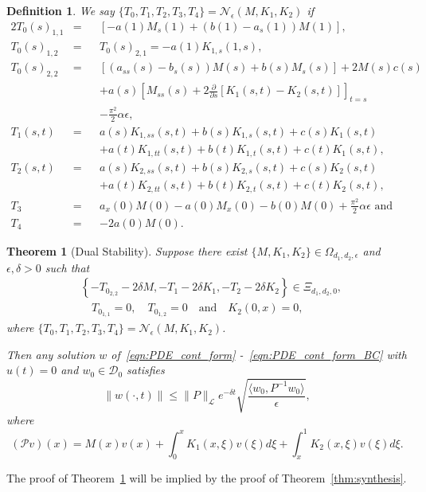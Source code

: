 \documentclass[9pt,journal,twocolumn]{IEEEtran}
\newtheorem{theorem}{Theorem}
\newtheorem{definition}{Definition}
\newcommand{\pfs}{\frac{\partial}{\partial s}}
\newcommand{\igzx}{\int_0^x}
\newcommand{\igxo}{\int_x^1}
\begin{document}
\begin{definition}
We say $\{T_0,T_1,T_2,T_3,T_4\}=\mathcal{N}_\epsilon(M,K_1,K_2)$ if
\begin{alignat}{2}
T_0(s)_{1,1}&= &&\left[-a(1)M_s(1)+(b(1)-a_s(1))M(1) \right], \\
T_0(s)_{1,2}&=&&T_0(s)_{2,1}=-a(1)K_{1,s}(1,s), \\
T_0(s)_{2,2}&= &&\left[(a_{ss}(s)-b_s(s))M(s)+b(s)M_s(s)\right]+2 M(s)c(s) \nonumber \\
 & && +a(s)\left[M_{ss}(s)+2\pfs \left[K_1(s,t)-K_2(s,t) \right] \right]_{t=s} \nonumber \\
 & && -\frac{\pi^2}{2}\alpha \epsilon ,\\
T_1(s,t)&= &&a(s)K_{1,ss}(s,t)+b(s)K_{1,s}(s,t)+c(s)K_1(s,t) \nonumber \\
 & &&+a(t)K_{1,tt}(s,t)+b(t)K_{1,t}(s,t)+c(t)K_1(s,t), \\
T_2(s,t)&=&& a(s)K_{2,ss}(s,t)+b(s)K_{2,s}(s,t)+c(s)K_2(s,t) \nonumber \\
 & &&+a(t)K_{2,tt}(s,t)+b(t)K_{2,t}(s,t)+c(t)K_2(s,t),\\
T_3&=&&a_x(0)M(0)-a(0)M_x(0)-b(0)M(0)+\frac{\pi^2}{2}\alpha \epsilon \text{ and }\\
T_4&=&&-2 a(0)M(0).
\end{alignat}
\end{definition}
\begin{theorem}[Dual Stability]\label{thm:dualstability}
Suppose there exist $\{M,K_1,K_2\} \in \Omega_{d_1,d_2,\epsilon}$  and $\epsilon,\delta>0$ such that
\begin{align*}
&\left\{-T_{0_{2,2}}-2\delta M,-T_1-2\delta K_1, -T_2-2\delta K_2\right\} \in \Xi_{d_1,d_2,0},\\
&\quad   T_{0_{1,1}}=0,\quad T_{0_{1,2}}=0 \quad \text{and} \quad K_2(0,x)=0,
\end{align*} 
where
$\{T_0,T_1,T_2,T_3,T_4\}=\mathcal{N}_\epsilon(M,K_1,K_2)$.

Then any solution $w$ of~\eqref{eqn:PDE_cont_form} -~\eqref{eqn:PDE_cont_form_BC} with $u(t)=0$ and $w_0 \in \mathcal{D}_0$ satisfies
\[
\|w(\cdot,t) \| \leq \|P\|_\mathcal{L} e^{-\delta t} \sqrt{\frac{\langle w_0,P^{-1}w_0 \rangle}{\epsilon}},
\]
where
 \[
 (\mathcal{P}v)(x)=M(x)v(x) + \igzx K_1(x,\xi) v(\xi) d \xi + \igxo K_2(x,\xi) v(\xi) d \xi.
 \]
 \end{theorem}
The proof of Theorem~\ref{thm:dualstability} will be implied by the proof of Theorem~\ref{thm:synthesis}.
\end{document}

